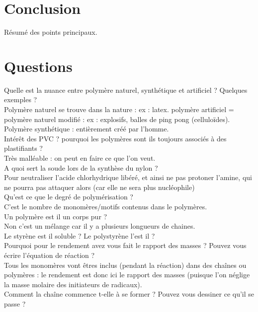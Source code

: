 \documentclass[12pt,prb,aps,epsf]{report}
\begin{document}
\section{Conclusion}
Résumé des points principaux.

\section*{Questions}
Quelle est la nuance entre polymère naturel, synthétique et artificiel ? Quelques exemples ? \\
Polymère naturel se trouve dans la nature : ex : latex. polymère artificiel = polymère naturel modifié : ex : explosifs, balles de ping pong (celluloïdes). Polymère synthétique : entièrement créé par l'homme.\\

Intérêt des PVC ? pourquoi les polymères sont ils toujours associés à des plastifiants ?\\
Très malléable : on peut en faire ce que l'on veut.\\

A quoi sert la soude lors de la synthèse du nylon ?\\
Pour neutraliser l'acide chlorhydrique libéré, et ainsi ne pas protoner l'amine, qui ne pourra pas attaquer alors (car elle ne sera plus nucléophile)\\

Qu'est ce que le degré de polymérisation ?\\
C'est le nombre de monomères/motifs contenus dans le polymères.\\

Un polymère est il un corps pur ?\\
Non c'est un mélange car il y a plusieurs longueurs de chaines.\\

Le styrène est il soluble ? Le polystyrène l'est il ?\\

Pourquoi pour le rendement avez vous fait le rapport des masses ? Pouvez vous écrire l'équation de réaction ?\\
Tous les monomères vont êtres inclus (pendant la réaction) dans des chaînes ou polymères : le rendement est donc ici le rapport des masses (puisque l'on néglige la masse molaire des initiateurs de radicaux).\\

Comment la chaîne commence t-elle à se former ? Pouvez vous dessiner ce qu'il se passe ?\\
\end{document}
